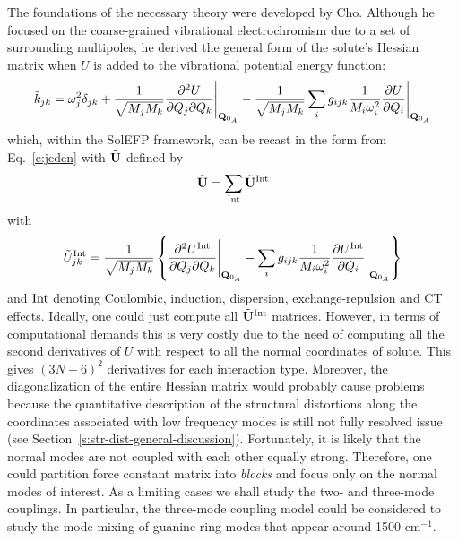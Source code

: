 \documentclass[a4paper,titlepage,twoside,fleqn,12pt]{book}
\newcommand{\fderiv}[2]{\ensuremath{
\frac{\partial #1}{\partial #2}}}
\newcommand{\sderivd}[3]{\ensuremath{
\frac{\partial^2 #1}{\partial #2 \partial #3}
}}
\begin{document}
\begin{refsection}
The foundations of the necessary theory were developed
by Cho.\citep{Cho.JCP.2009} Although he focused on the coarse\hyp{}grained
vibrational electrochromism due to a set of surrounding
multipoles, he derived the general form of the solute's
Hessian matrix when $U$ is added to the vibrational potential
energy function:
%
\begin{equation} 
 \tilde{k}_{jk} = \omega_j^2 \delta_{jk} + \frac{1}{\sqrt{M_jM_k}}\sderivd{U}{Q_j}{Q_k}  \Bigg|_{{\bf Q}_{0_A}} 
                           - \frac{1}{\sqrt{M_jM_k}}\sum_i g_{ijk} 
                             \frac{1}{M_i\omega_i^2}\fderiv{U}{Q_i}          \Bigg|_{{\bf Q}_{0_A}}        
\end{equation}
%
which, within the SolEFP framework, can be recast in
the form from Eq.~\eqref{e:jeden} with $\tilde{\bf U}$
defined by
%
\begin{equation} \label{e:dwa}
 \tilde{\bf U} = \sum_{\rm Int} \tilde{\bf U}^{\rm Int}
\end{equation}
%
with
%
\begin{equation}  \label{e:trzy}
 \tilde{U}^{\rm Int}_{jk} = \frac{1}{\sqrt{M_jM_k}} \left\{
            \sderivd{U^{\rm Int}}{Q_j}{Q_k}  \Bigg|_{{\bf Q}_{0_A}} 
           - \sum_i g_{ijk} \frac{1}{M_i\omega_i^2}\fderiv{U^{\rm Int}}{Q_i} \Bigg|_{{\bf Q}_{0_A}} 
           \right\}
\end{equation}
%
and $\rm Int$ denoting Coulombic, induction, dispersion, exchange\hyp{}repulsion
and CT effects. 
Ideally, one could just compute all
$\tilde{\bf U}^{\rm Int}$ matrices. However, in terms of
computational demands this is very costly due to the
need of computing all the second derivatives of $U$
with respect to all the normal coordinates of solute.
This gives $(3N-6)^2$ derivatives for each interaction
type. Moreover, the diagonalization of the entire Hessian
matrix would probably cause problems because the quantitative
description of the structural distortions
along the coordinates associated with low frequency modes
is still not fully resolved issue (see Section~\ref{s:str-dist-general-discussion}). 
Fortunately, it is likely that the normal modes
are not coupled with each other equally strong. Therefore,
one could partition force constant matrix into \emph{blocks}
and focus only on the normal modes of interest. As a limiting
cases we shall study the two\hyp{} and three\hyp{}mode
couplings. 
In particular, the three\hyp{}mode coupling model 
could be considered to study the mode mixing of
guanine ring modes that appear around 1500 cm$^{-1}$.


\end{refsection}
\end{document}
